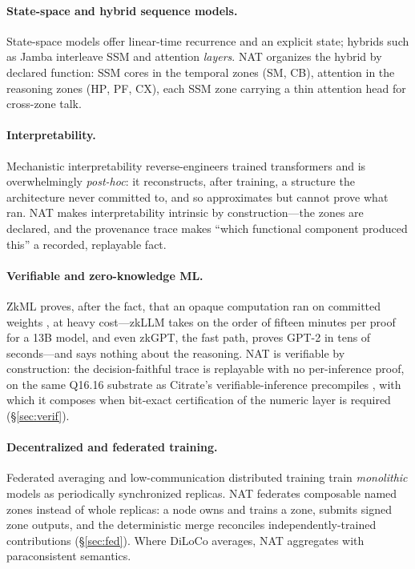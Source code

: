\documentclass[11pt]{article}
\newcommand{\zone}[1]{\textsc{#1}}
\newcommand{\Qff}{Q16.16}
\begin{document}
\paragraph{State-space and hybrid sequence models.}
State-space models \citep{gu2021s4,gu2023mamba,dao2024mamba2} offer linear-time recurrence and an
explicit state; hybrids such as Jamba \citep{lieber2024jamba} interleave SSM and attention
\emph{layers}. NAT organizes the hybrid by declared function: SSM cores in the temporal zones (\zone{SM},
\zone{CB}), attention in the reasoning zones (\zone{HP}, \zone{PF}, \zone{CX}), each SSM zone carrying a
thin attention head for cross-zone talk.

\paragraph{Interpretability.}
Mechanistic interpretability reverse-engineers trained transformers
\citep{rai2024practical,bereska2024mechanistic} and is overwhelmingly \emph{post-hoc}: it
reconstructs, after training, a structure the architecture never committed to, and so approximates
but cannot prove what ran. NAT makes interpretability intrinsic by construction---the zones are
declared, and the provenance trace makes ``which functional component produced this'' a recorded,
replayable fact.

\paragraph{Verifiable and zero-knowledge ML.}
ZkML proves, after the fact, that an opaque computation ran on committed weights
\citep{chen2024zkml,sun2024zkllm,qu2025zkgpt,peng2025survey}, at heavy cost---zkLLM takes on the order
of fifteen minutes per proof for a 13B model, and even zkGPT, the fast path, proves GPT-2 in tens of
seconds---and says nothing about the reasoning. NAT is verifiable by construction: the
decision-faithful trace is replayable with no per-inference proof, on the same \Qff{} substrate as
Citrate's verifiable-inference precompiles \citep{citrate10}, with which it composes when bit-exact
certification of the numeric layer is required (\S\ref{sec:verif}).

\paragraph{Decentralized and federated training.}
Federated averaging \citep{mcmahan2017communication} and low-communication distributed training
\citep{douillard2023diloco,prime2024opendiloco} train \emph{monolithic} models as periodically
synchronized replicas. NAT federates composable named zones instead of whole replicas: a node owns
and trains a zone, submits signed zone outputs, and the deterministic merge reconciles
independently-trained contributions (\S\ref{sec:fed}). Where DiLoCo averages, NAT aggregates with
paraconsistent semantics.
\end{document}
